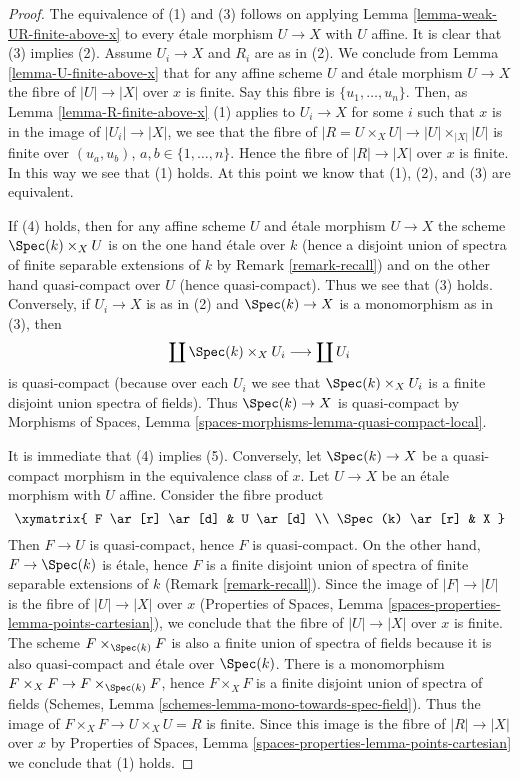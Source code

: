 \begin{proof}
The equivalence of (1) and (3) follows on applying
Lemma \ref{lemma-weak-UR-finite-above-x}
to every \'etale morphism $U \to X$ with $U$ affine.
It is clear that (3) implies (2).
Assume $U_i \to X$ and $R_i$ are as in (2). We conclude from
Lemma \ref{lemma-U-finite-above-x}
that for any affine scheme $U$ and \'etale morphism $U \to X$
the fibre of $|U| \to |X|$ over $x$ is finite.
Say this fibre is $\{u_1, \ldots, u_n\}$. Then, as
Lemma \ref{lemma-R-finite-above-x} (1)
applies to $U_i \to X$ for some $i$ such that $x$ is in the image of
$|U_i| \to |X|$, we see that the fibre of
$|R = U \times_X U| \to |U| \times_{|X|} |U|$
is finite over $(u_a, u_b)$, $a, b \in \{1, \ldots, n\}$.
Hence the fibre of $|R| \to |X|$ over $x$ is finite.
In this way we see that (1) holds. At this point we know that
(1), (2), and (3) are equivalent.

\medskip\noindent
If (4) holds, then for any affine scheme $U$ and \'etale morphism
$U \to X$ the scheme $\Spec(k) \times_X U$ is on the one hand
\'etale over $k$ (hence a disjoint union of spectra of finite separable
extensions of $k$ by
Remark \ref{remark-recall})
and on the other hand quasi-compact over $U$ (hence quasi-compact).
Thus we see that (3) holds.
Conversely, if $U_i \to X$ is as in (2) and $\Spec(k) \to X$
is a monomorphism as in (3), then
$$
\coprod \Spec(k) \times_X U_i
\longrightarrow
\coprod U_i
$$
is quasi-compact (because over each $U_i$ we see that
$\Spec(k) \times_X U_i$ is a finite disjoint union spectra of fields).
Thus $\Spec(k) \to X$ is quasi-compact by
Morphisms of Spaces, Lemma \ref{spaces-morphisms-lemma-quasi-compact-local}.

\medskip\noindent
It is immediate that (4) implies (5). Conversely, let $\Spec(k) \to X$
be a quasi-compact morphism in the equivalence class of $x$. Let $U \to X$
be an \'etale morphism with $U$ affine. Consider the fibre product
$$
\xymatrix{
F \ar[r] \ar[d] & U \ar[d] \\
\Spec(k) \ar[r] & X
}
$$
Then $F \to U$ is quasi-compact, hence $F$ is quasi-compact.
On the other hand, $F \to \Spec(k)$ is \'etale, hence $F$ is a
finite disjoint union of spectra of finite separable extensions of $k$
(Remark \ref{remark-recall}). Since the image of $|F| \to |U|$
is the fibre of $|U| \to |X|$ over $x$ (Properties of Spaces, Lemma
\ref{spaces-properties-lemma-points-cartesian}), we conclude that
the fibre of $|U| \to |X|$ over $x$ is finite. The scheme
$F \times_{\Spec(k)} F$ is also a finite union of spectra of fields
because it is also quasi-compact and \'etale over $\Spec(k)$.
There is a monomorphism
$F \times_X F \to F \times_{\Spec(k)} F$, hence $F \times_X F$ is
a finite disjoint union of spectra of fields
(Schemes, Lemma \ref{schemes-lemma-mono-towards-spec-field}).
Thus the image of $F \times_X F \to U \times_X U = R$ is finite.
Since this image is the fibre of $|R| \to |X|$ over $x$ by
Properties of Spaces, Lemma \ref{spaces-properties-lemma-points-cartesian}
we conclude that (1) holds.
\end{proof}

